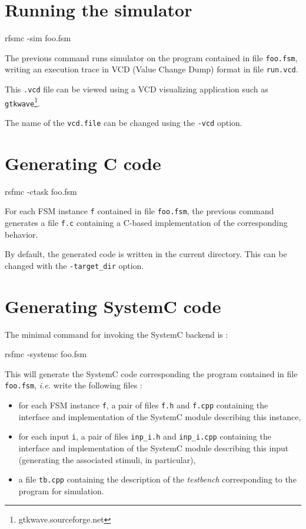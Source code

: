 \section{Running the simulator}
\label{sec:running-simulator}

\begin{example}
rfsmc -sim foo.fsm  
\end{example}

The previous command runs simulator on the program contained in file \texttt{foo.fsm}, writing
an execution trace in VCD (Value Change Dump) format in file \verb|run.vcd|.

This \verb|.vcd| file can be viewed using a VCD visualizing application such as
\verb|gtkwave|\footnote{gtkwave.sourceforge.net}.

The name of the \verb|vcd.file| can be changed using the \verb|-vcd| option.

\section{Generating C code}
\label{sec:gener-c-code}

\begin{example}
rsfmc -ctask foo.fsm  
\end{example}

For each FSM instance \verb|f| contained in file \verb|foo.fsm|, the previous command generates a file
\verb|f.c| containing a C-based implementation of the corresponding behavior.

By default, the generated code is written in the current directory. This can be changed with the
\verb|-target_dir| option.

\section{Generating SystemC code}
\label{sec:gener-syst-code}

The minimal command for invoking the SystemC backend is :

\begin{example}
rsfmc -systemc foo.fsm  
\end{example}

This will  generate the SystemC code corresponding the program contained in file
\texttt{foo.fsm}, \emph{i.e.} write the following files :
\begin{itemize}
\item for each FSM instance \verb|f|, a pair of files \verb|f.h| and \verb|f.cpp| containing the
  interface and implementation of the SystemC module describing this instance,
\item for each input \verb|i|, a pair of files \verb|inp_i.h| and \verb|inp_i.cpp| containing the
  interface and implementation of the SystemC module describing this input (generating the
  associated stimuli, in particular),
\item a file \verb|tb.cpp| containing the description of the \emph{testbench} corresponding to the
  program for simulation.
\end{itemize}

